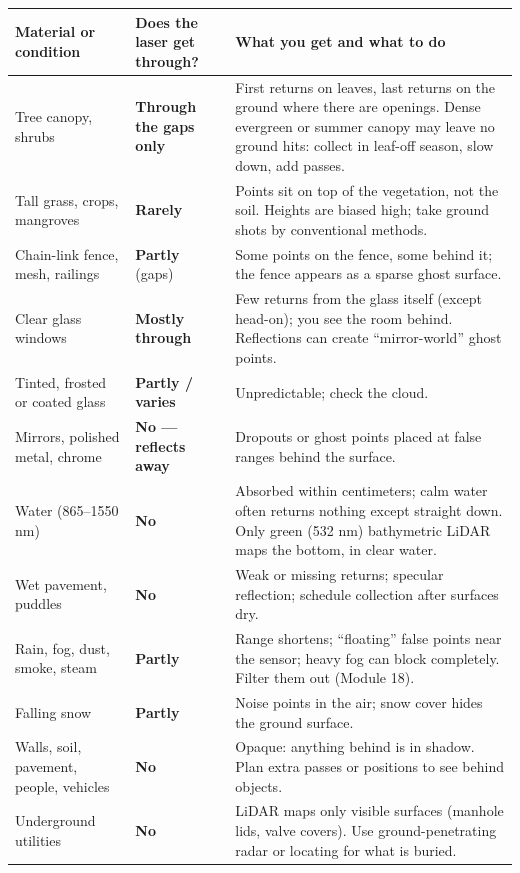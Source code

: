 \begin{center}\small
\renewcommand{\arraystretch}{1.2}
\begin{tabularx}{\linewidth}{>{\raggedright\arraybackslash}p{3.0cm}>{\raggedright\arraybackslash}p{2.2cm}X}\toprule
\textbf{Material or condition} & \textbf{Does the laser get through?} & \textbf{What you get and what to do}\\\midrule
Tree canopy, shrubs & \textbf{Through the gaps only} & First returns on leaves, last returns on the ground where there are openings. Dense evergreen or summer canopy may leave no ground hits: collect in leaf-off season, slow down, add passes.\\
Tall grass, crops, mangroves & \textbf{Rarely} & Points sit on top of the vegetation, not the soil. Heights are biased high; take ground shots by conventional methods.\\
Chain-link fence, mesh, railings & \textbf{Partly} (gaps) & Some points on the fence, some behind it; the fence appears as a sparse ghost surface.\\
Clear glass windows & \textbf{Mostly through} & Few returns from the glass itself (except head-on); you see the room behind. Reflections can create ``mirror-world'' ghost points.\\
Tinted, frosted or coated glass & \textbf{Partly / varies} & Unpredictable; check the cloud.\\
Mirrors, polished metal, chrome & \textbf{No --- reflects away} & Dropouts or ghost points placed at false ranges behind the surface.\\
Water (865--1550 nm) & \textbf{No} & Absorbed within centimeters; calm water often returns nothing except straight down. Only green (532 nm) bathymetric LiDAR maps the bottom, in clear water.\\
Wet pavement, puddles & \textbf{No} & Weak or missing returns; specular reflection; schedule collection after surfaces dry.\\
Rain, fog, dust, smoke, steam & \textbf{Partly} & Range shortens; ``floating'' false points near the sensor; heavy fog can block completely. Filter them out (Module 18).\\
Falling snow & \textbf{Partly} & Noise points in the air; snow cover hides the ground surface.\\
Walls, soil, pavement, people, vehicles & \textbf{No} & Opaque: anything behind is in shadow. Plan extra passes or positions to see behind objects.\\
Underground utilities & \textbf{No} & LiDAR maps only visible surfaces (manhole lids, valve covers). Use ground-penetrating radar or locating for what is buried.\\\bottomrule
\end{tabularx}\end{center}

